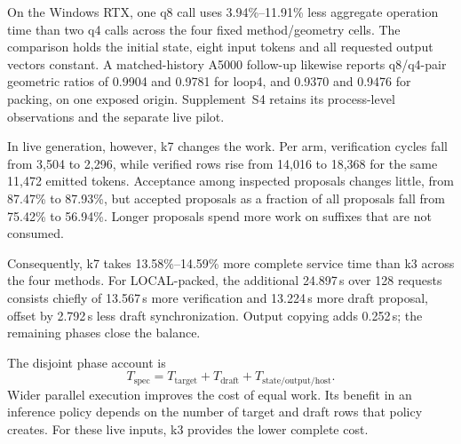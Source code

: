 On the Windows RTX, one q8 call uses 3.94\%--11.91\% less aggregate operation time than two q4 calls across the four fixed method/geometry cells. The comparison holds the initial state, eight input tokens and all requested output vectors constant. A matched-history A5000 follow-up likewise reports q8/q4-pair geometric ratios of 0.9904 and 0.9781 for loop4, and 0.9370 and 0.9476 for packing, on one exposed origin. Supplement~S4 retains its process-level observations and the separate live pilot.

In live generation, however, k7 changes the work. Per arm, verification cycles fall from 3,504 to 2,296, while verified rows rise from 14,016 to 18,368 for the same 11,472 emitted tokens. Acceptance among inspected proposals changes little, from 87.47\% to 87.93\%, but accepted proposals as a fraction of all proposals fall from 75.42\% to 56.94\%. Longer proposals spend more work on suffixes that are not consumed.

Consequently, k7 takes 13.58\%--14.59\% more complete service time than k3 across the four methods. For LOCAL-packed, the additional 24.897\,s over 128 requests consists chiefly of 13.567\,s more verification and 13.224\,s more draft proposal, offset by 2.792\,s less draft synchronization. Output copying adds 0.252\,s; the remaining phases close the balance.

The disjoint phase account is
\begin{equation}
 T_{\mathrm{spec}}=T_{\mathrm{target}}+T_{\mathrm{draft}}+T_{\mathrm{state/output/host}}.
 \label{eq:cost}
\end{equation}
Wider parallel execution improves the cost of equal work. Its benefit in an inference policy depends on the number of target and draft rows that policy creates. For these live inputs, k3 provides the lower complete cost.
